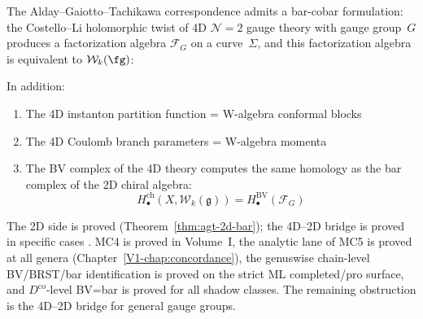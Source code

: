 \begin{remark}\label{rem:agt-bar-cobar}
The Alday--Gaiotto--Tachikawa correspondence \cite{AGT09} admits a
bar-cobar formulation: the Costello--Li holomorphic twist of 4D
$\mathcal{N}=2$ gauge theory with gauge group~$G$ produces a
factorization algebra $\mathcal{F}_G$ on a curve~$\Sigma$, and
this factorization algebra is equivalent to $\mathcal{W}_k(\fg)$:

\begin{center}
\end{center}

In addition:
\begin{enumerate}
\item The 4D instanton partition function = W-algebra conformal blocks
\item The 4D Coulomb branch parameters = W-algebra momenta
\item The BV complex of the 4D theory computes the same homology as
 the bar complex of the 2D chiral algebra:
 \[H_\bullet^{\text{ch}}(X, \mathcal{W}_k(\mathfrak{g})) = H_\bullet^{\text{BV}}(\mathcal{F}_G)\]
\end{enumerate}
\end{remark}

\begin{remark}
The 2D side is proved (Theorem~\ref{thm:agt-2d-bar}); the 4D--2D bridge is proved in specific cases \cite{SV13,MO19}. MC4 is proved in Volume~I, the analytic lane of MC5 is proved at all genera (Chapter~\ref*{V1-chap:concordance}), the genuswise chain-level BV/BRST/bar identification is proved on the strict ML completed/pro surface, and $D^{\mathrm{co}}$-level BV=bar is proved for all shadow classes. The remaining obstruction is the 4D--2D bridge for general gauge groups.
\end{remark}



